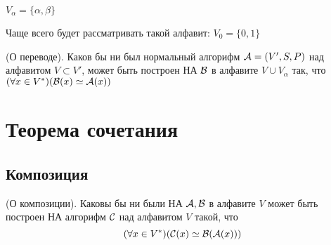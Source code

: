 $V_{\alpha} = \{\alpha,\beta\} $ 

Чаще всего будет рассматривать такой алфавит: $V_0=\{0,1\} $ 

\medskip

\begin{theorem}
    (О переводе). Каков бы ни был нормальный алгорифм $ {\cal A} = (V',S,P)$
    над алфавитом $V \subset V'$, может быть построен НА $ {\cal B}$ в алфавите $V \cup V_{\alpha}$
    так, что $(\forall x \in V^{*})( {\cal B}(x) \simeq {\cal A}(x))$
\end{theorem}

\section{Теорема сочетания}
\subsection{Композиция}


\begin{theorem}
    (О композиции). Каковы бы ни были НА $ {\cal A, B}$ в алфавите $V$ может быть построен
    НА алгорифм  $ {\cal C}$ над алфавитом $V$ такой, что 
    \[
        (\forall x \in V^{*})( {\cal C}(x) \simeq {\cal B}( {\cal A}(x) ) )
    \] 
\end{theorem}

